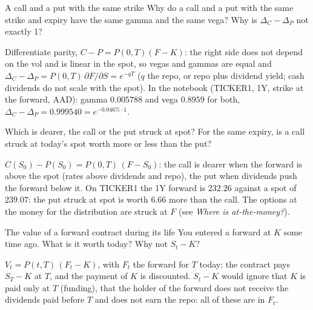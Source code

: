 \begin{question}{\Theory \Practice {}}{A call and a put with the same strike}
Why do a call and a put with the same strike and expiry have the same gamma and the same vega? Why is
$\Delta_C - \Delta_P$ not exactly 1?
\end{question}
\begin{answer}
Differentiate parity, $C - P = P(0,T)(F - K)$: the right side does not depend on the vol and is linear in the spot,
so vegas and gammas are equal and $\Delta_C - \Delta_P = P(0,T)\,\partial F/\partial S = e^{-q T}$ ($q$ the repo, or repo
plus dividend yield; cash dividends do not scale with the spot). In the notebook (TICKER1, 1Y, strike at the forward,
AAD): gamma $0.005788$ and vega $0.8959$ for both, $\Delta_C - \Delta_P = 0.999540 = e^{-0.046\% \cdot 1}$.
\end{answer}

\begin{question}{\Theory {}}{Which is dearer, the call or the put struck at spot?}
For the same expiry, is a call struck at today's spot worth more or less than the put?
\end{question}
\begin{answer}
$C(S_0) - P(S_0) = P(0,T)\,(F - S_0)$: the call is dearer when the forward is above the spot (rates above dividends
and repo), the put when dividends push the forward below it. On TICKER1 the 1Y forward is $232.26$ against a spot of
$239.07$: the put struck at spot is worth $6.66$ more than the call. The options at the money for the distribution
are struck at $F$ (see \emph{Where is at-the-money?}).
\end{answer}

\begin{question}{\Theory {}}{The value of a forward contract during its life}
You entered a forward at $K$ some time ago. What is it worth today? Why not $S_t - K$?
\end{question}
\begin{answer}
$V_t = P(t,T)\,(F_t - K)$, with $F_t$ the forward for $T$ today: the contract pays $S_T - K$ at $T$, and the payment of
$K$ is discounted. $S_t - K$ would ignore that $K$ is paid only at $T$ (funding), that the holder of the forward does
not receive the dividends paid before $T$ and does not earn the repo: all of these are in $F_t$.
\end{answer}


